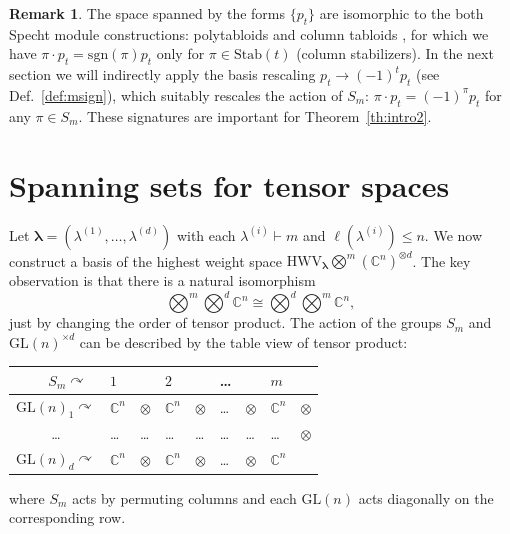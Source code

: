 \documentclass[12pt, reqno]{amsart}
\theoremstyle{definition}
\newtheorem{remark}{Remark}[section]
\newcommand{\sgn}{\mathrm{sgn}}
\def\acts{\curvearrowright}
\begin{document}
\begin{remark}
    The space spanned by the forms $\{p_t\}$ are isomorphic to the both Specht module constructions: polytabloids and column tabloids \cite{ful}, for which we have $\pi \cdot p_t = \sgn(\pi) p_t$ only for $\pi \in \mathrm{Stab}(t)$ (column stabilizers).
    In the next section we will indirectly apply the basis rescaling $p_t \to (-1)^t p_t$ (see Def.~\ref{def:msign}), which suitably rescales the action of $S_m$: $\pi \cdot p_t = (-1)^{\pi} p_t$ for any $\pi \in S_m$. These signatures are important for Theorem~\ref{th:intro2}.
\end{remark}

\section{Spanning sets for tensor spaces}\label{sec:spanningtensor}
Let $\pmb{\lambda} = (\lambda^{(1)}, \ldots, \lambda^{(d)})$ with each $\lambda^{(i)} \vdash m$ and $\ell(\lambda^{(i)}) \le n$.
We now construct a basis of the highest weight space $\mathrm{HWV}_{\pmb{\lambda}} \bigotimes^m (\mathbb{C}^{n})^{\otimes d}$. The key observation is that there is a natural isomorphism
$$
    \bigotimes^m \bigotimes^d \mathbb{C}^n \cong \bigotimes^d \bigotimes^m  \mathbb{C}^n,
$$
just by changing the order of tensor product. The action of the groups $S_m$ and $\mathrm{GL}(n)^{\times d}$ can be described by the table view of tensor product:
\begin{center}
    \begin{tabular}{  c | l l l l l l l l} 
                \quad\ \ \ $S_m\acts$  & $1$            &         & $2$            &        &\ldots &        & $m$           & \\ \hline
$\mathrm{GL}(n)_1\acts$ & $\mathbb{C}^n$ & $\otimes$ & $\mathbb{C}^n$ &$\otimes$ &\ldots &$\otimes$ &$\mathbb{C}^n$ & $\otimes$ \\ %
\ldots                & \ldots       & \ldots  & \ldots       &\ldots  &\ldots &\ldots  &\ldots       & $\otimes$ \\
$\mathrm{GL}(n)_d\acts$ & $\mathbb{C}^n$ & $\otimes$ & $\mathbb{C}^n$ &$\otimes$ &\ldots &$\otimes$ &$\mathbb{C}^n$ & \\
\end{tabular}
\end{center}
where $S_m$ acts by permuting columns and each $\mathrm{GL}(n)$ acts diagonally on the corresponding row.
\end{document}

